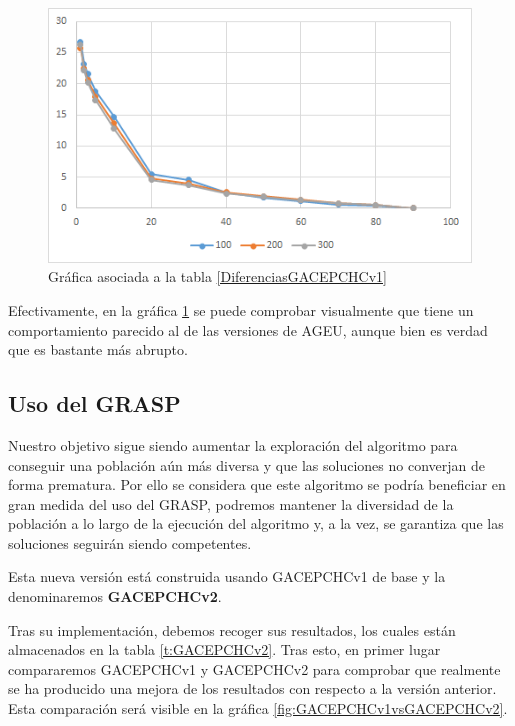 \begin{figure}[h]
		\centering
		\includegraphics[scale=1]{imagenes/Experimental/DiferenciasGACEPCHCv1.png}
        \caption{Gráfica asociada a la tabla \ref{DiferenciasGACEPCHCv1}}
        \label{fig:DiferenciasGACEPCHCv1}
\end{figure}

Efectivamente, en la gráfica \ref{fig:DiferenciasGACEPCHCv1} se puede comprobar visualmente que tiene un comportamiento parecido al de las versiones de AGEU, aunque bien es verdad que es bastante más abrupto.

\subsection{Uso del GRASP}

Nuestro objetivo sigue siendo aumentar la exploración del algoritmo para conseguir una población aún más diversa y que las soluciones no converjan de forma prematura. 
Por ello se considera que este algoritmo se podría beneficiar en gran medida del uso del GRASP, podremos mantener la diversidad de la población a lo largo de la ejecución del algoritmo y, a la vez, se garantiza que las soluciones seguirán siendo competentes. 

Esta nueva versión está construida usando GACEPCHCv1 de base y la denominaremos \textbf{GACEPCHCv2}.

Tras su implementación, debemos recoger sus resultados, los cuales están almacenados en la tabla \ref{t:GACEPCHCv2}. 
Tras esto, en primer lugar compararemos GACEPCHCv1 y GACEPCHCv2 para comprobar que realmente se ha producido una mejora de los resultados con respecto a la versión anterior. 
Esta comparación será visible en la gráfica \ref{fig:GACEPCHCv1vsGACEPCHCv2}.


